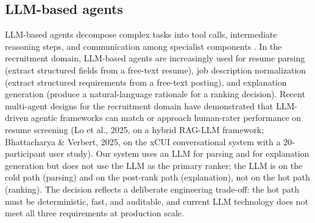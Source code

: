 \subsection{LLM-based agents}
LLM-based agents decompose complex tasks into tool calls, intermediate reasoning steps, and communication among specialist components \citep{wei2022chain,yao2023react,sumers2024cognitive}.
In the recruitment domain, LLM-based agents are increasingly used for resume parsing (extract structured fields from a free-text resume), job description normalization (extract structured requirements from a free-text posting), and explanation generation (produce a natural-language rationale for a ranking decision).
Recent multi-agent designs for the recruitment domain \citep{lo2025hiring,bhattacharya2025xcui} have demonstrated that LLM-driven agentic frameworks can match or approach human-rater performance on resume screening (Lo et al., 2025, on a hybrid RAG-LLM framework; Bhattacharya \& Verbert, 2025, on the xCUI conversational system with a 20-participant user study).
Our system uses an LLM for parsing and for explanation generation but does not use the LLM as the primary ranker; the LLM is on the cold path (parsing) and on the post-rank path (explanation), not on the hot path (ranking).
The decision reflects a deliberate engineering trade-off: the hot path must be deterministic, fast, and auditable, and current LLM technology does not meet all three requirements at production scale.

